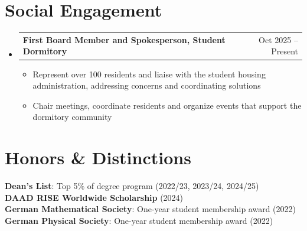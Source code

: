 \documentclass[letterpaper,11pt]{article}
\makeatletter
\newcommand{\resumeItem}[1]{
  \item\small{
    {#1 \vspace{-3pt}}
  }
}
\newcommand{\resumeProjectHeading}[2]{
    \item
    \begin{tabular*}{0.97\textwidth}{l@{\extracolsep{\fill}}r}
      \small#1 & #2 \\
    \end{tabular*}\vspace{-7pt}
}
\newcommand{\resumeSubHeadingListStart}{\begin{itemize}[leftmargin=0.15in, label={}]}
\newcommand{\resumeSubHeadingListEnd}{\end{itemize}}
\newcommand{\resumeItemListStart}{\begin{itemize}}
\newcommand{\resumeItemListEnd}{\end{itemize}\vspace{-7pt}}
\makeatother
\begin{document}
\section{Social Engagement}

\resumeSubHeadingListStart
\resumeProjectHeading
    {\textbf{First Board Member and Spokesperson, Student Dormitory}}{Oct 2025 -- Present}
\resumeItemListStart
    \resumeItem{Represent over 100 residents and liaise with the student housing administration, addressing concerns and coordinating solutions}
    \resumeItem{Chair meetings, coordinate residents and organize events that support the dormitory community}
\resumeItemListEnd
\resumeSubHeadingListEnd
\section{Honors \& Distinctions}

\begin{itemize}[leftmargin=0.15in, label={}]
\small{
\item{
\textbf{Dean’s List}: Top 5\% of degree program (2022/23, 2023/24, 2024/25) \\
\textbf{DAAD RISE Worldwide Scholarship} (2024) \\
\textbf{German Mathematical Society}: One-year student membership award (2022) \\
\textbf{German Physical Society}: One-year student membership award (2022)
}}
\end{itemize}
\end{document}
